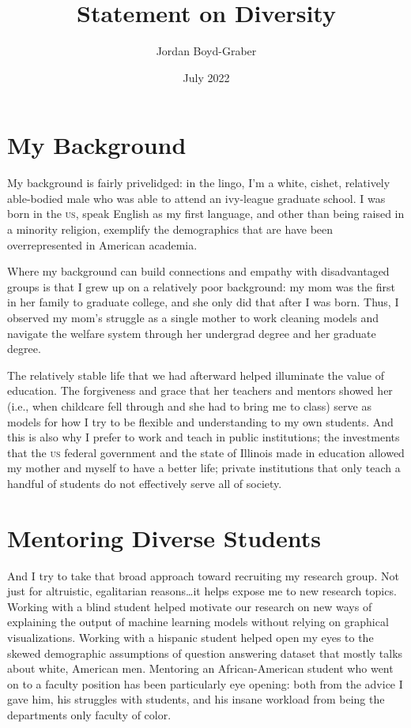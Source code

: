 \documentclass[11pt]{amsart}
\newcommand{\abr}[1]{\textsc{#1}}
\begin{document}
 \title{Statement on Diversity}

 \author{Jordan Boyd-Graber}
\address{University of Maryland}

\date{July 2022}


\keywords{}

\maketitle

\section{My Background}

My background is fairly privelidged: in the lingo, I'm a white, cishet, relatively able-bodied male who was able to attend an ivy-league graduate school.
%
I was born in the \abr{us}, speak English as my first language, and other than being raised in a minority religion, exemplify the demographics that are have been overrepresented in American academia.

Where my background can build connections and empathy with disadvantaged groups is that I grew up on a relatively poor background: my mom was the first in her family to graduate college, and she only did that after I was born.
%
Thus, I observed my mom's struggle as a single mother to work cleaning models and navigate the welfare system through her undergrad degree and her graduate degree.

The relatively stable life that we had afterward helped illuminate the value of education.
%
The forgiveness and grace that her teachers and mentors showed her (i.e., when childcare fell through and she had to bring me to class) serve as models for how I try to be flexible and understanding to my own students.
%
And this is also why I prefer to work and teach in public institutions; the investments that the \abr{us} federal government and the state of Illinois made in education allowed my mother and myself to have a better life; private institutions that only teach a handful of students do not effectively serve all of society.

\section{Mentoring Diverse Students}

And I try to take that broad approach toward recruiting my research group.
%
Not just for altruistic, egalitarian reasons\dots it helps expose me to new research topics.
%
Working with a blind student helped motivate our research on new ways of explaining the output of machine learning models without relying on graphical visualizations.
%
Working with a hispanic student helped open my eyes to the skewed demographic assumptions of question answering dataset that mostly talks about white, American men.
%
Mentoring an African-American student who went on to a faculty position has been particularly eye opening: both from the advice I gave him, his struggles with students, and his insane workload from being the departments only faculty of color.
\end{document}
